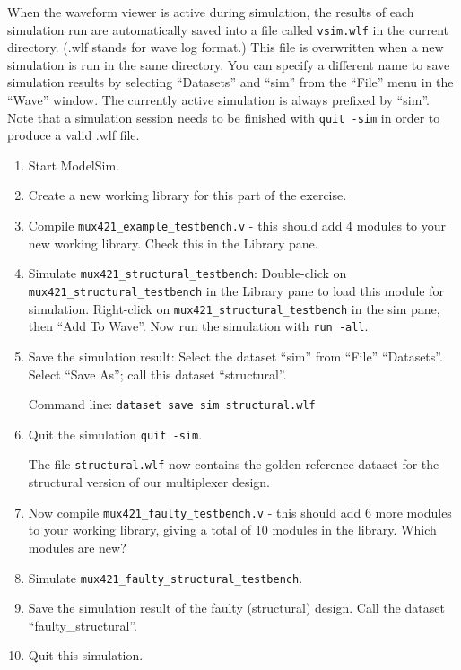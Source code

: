 \documentclass[a4paper,11pt]{article}
\begin{document}
\smallskip
{}
\smallskip

When the waveform viewer is active during simulation, the results of each
simulation run are automatically saved into a file called \verb#vsim.wlf# in
the current directory. (.wlf stands for wave log format.)  This file is
overwritten when a new simulation is run in the same directory. You can specify
a different name to save simulation results by selecting ``Datasets'' and
``sim'' from the ``File'' menu in the ``Wave'' window. The currently active
simulation is always prefixed by ``sim''. Note that a simulation session needs
to be finished with \verb#quit -sim# in order to produce a valid .wlf file.

\begin{enumerate}
\item Start ModelSim.
\item Create a new working library for this part of the exercise.
\item Compile \verb#mux421_example_testbench.v# - this should add 4 modules to
  your new working library. Check this in the Library pane.
\item Simulate \verb#mux421_structural_testbench#: Double-click on
  \verb#mux421_structural_testbench# in the Library pane to load this module
  for simulation. Right-click on \verb#mux421_structural_testbench# in the sim
  pane, then ``Add To Wave''. Now run the simulation with \verb#run -all#.
\item Save the simulation result: Select the dataset ``sim'' from  ``File''
  ``Datasets''. Select ``Save As''; call this dataset ``structural''. 

  Command line: \verb#dataset save sim structural.wlf#
\item Quit the simulation \verb#quit -sim#.
  
  The file \verb#structural.wlf# now contains the golden reference dataset for
  the structural version of our multiplexer design.

\item Now compile \verb#mux421_faulty_testbench.v# - this should add 6 more
  modules to your working library, giving a total of 10 modules in the
  library. Which modules are new?
\item Simulate \verb#mux421_faulty_structural_testbench#.
\item Save the simulation result of the faulty (structural) design. Call the
  dataset ``faulty\_structural''.
\item Quit this simulation.


\end{enumerate}
\end{document}
